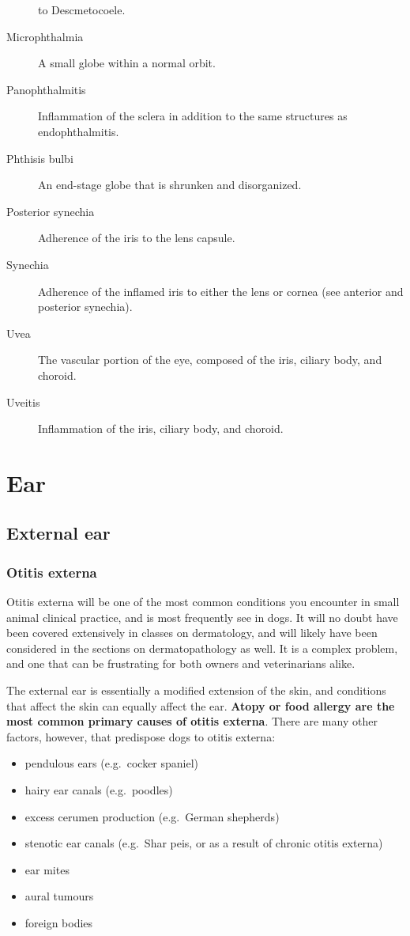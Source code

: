 \documentclass[openany]{article}
\providecommand{\tightlist}{%
  \setlength{\itemsep}{0pt}\setlength{\parskip}{0pt}}
\begin{document}
\begin{description}
to Descmetocoele.
\item[Microphthalmia]
A small globe within a normal orbit.
\item[Panophthalmitis]
Inflammation of the sclera in addition to the same structures as
endophthalmitis.
\item[Phthisis bulbi]
An end-stage globe that is shrunken and disorganized.
\item[Posterior synechia]
Adherence of the iris to the lens capsule.
\item[Synechia]
Adherence of the inflamed iris to either the lens or cornea (see
anterior and posterior synechia).
\item[Uvea]
The vascular portion of the eye, composed of the iris, ciliary body, and
choroid.
\item[Uveitis]
Inflammation of the iris, ciliary body, and choroid.
\end{description}

\section{Ear}\label{ear}

\subsection{External ear}\label{external-ear}

\hypertarget{otitis-externa}{\subsubsection{Otitis
externa}\label{otitis-externa}}

Otitis externa will be one of the most common conditions you encounter
in small animal clinical practice, and is most frequently see in dogs.
It will no doubt have been covered extensively in classes on
dermatology, and will likely have been considered in the sections on
dermatopathology as well. It is a complex problem, and one that can be
frustrating for both owners and veterinarians alike.

The external ear is essentially a modified extension of the skin, and
conditions that affect the skin can equally affect the ear.
\textbf{Atopy or food allergy are the most common primary causes of
otitis externa}. There are many other factors, however, that predispose
dogs to otitis externa:

\begin{itemize}
\tightlist
\item
  pendulous ears (e.g.~cocker spaniel)
\item
  hairy ear canals (e.g.~poodles)
\item
  excess cerumen production (e.g.~German shepherds)
\item
  stenotic ear canals (e.g.~Shar peis, or as a result of chronic otitis
  externa)
\item
  ear mites
\item
  aural tumours
\item
  foreign bodies
\end{itemize}
\end{document}
